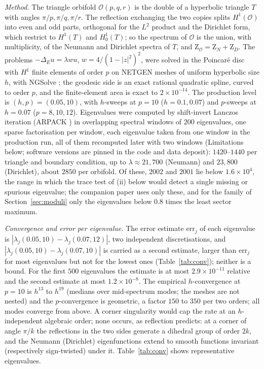 \documentclass[pdflatex,sn-mathphys-num]{sn-jnl}
\newcommand{\Orb}{\mathcal{O}}
\newcommand{\cZ}{\mathrm{Z}}
\theoremstyle{thmstyleone}%
\theoremstyle{thmstylethree}%
\providecommand{\Orb}{\mathcal{O}}
\providecommand{\cZ}{\mathrm{Z}}
\begin{document}
\emph{Method.} The triangle orbifold $\Orb(p,q,r)$ is the double of a hyperbolic triangle $T$ with angles $\pi/p,\pi/q,\pi/r$. The reflection exchanging the two copies splits $H^1(\Orb)$ into even and odd parts, orthogonal for the $L^2$ product and the Dirichlet form, which restrict to $H^1(T)$ and $H^1_0(T)$; so the spectrum of $\Orb$ is the union, with multiplicity, of the Neumann and Dirichlet spectra of $T$, and $\cZ_\Orb=\cZ_N+\cZ_D$. The problems $-\Delta_Eu=\lambda wu$, $w=4/(1-|z|^2)^2$, were solved in the Poincar\'e disc with $H^1$ finite elements of order $p$ on NETGEN meshes \cite{schoberl1997} of uniform hyperbolic size $h$, with NGSolve \cite{ngsolve}; the geodesic side is an exact rational quadratic spline, curved to order $p$, and the finite-element area is exact to $2\times10^{-14}$. The production level is $(h,p)=(0.05,10)$, with $h$-sweeps at $p=10$ ($h=0.1,0.07$) and $p$-sweeps at $h=0.07$ ($p=8,10,12$). Eigenvalues were computed by shift-invert Lanczos iteration (ARPACK \cite{arpack1998}) in overlapping spectral windows of $200$ eigenvalues, one sparse factorisation per window, each eigenvalue taken from one window in the production run, all of them recomputed later with two windows (Limitations below; software versions are pinned in the code and data deposit): $1420$--$1440$ per triangle and boundary condition, up to $\lambda\approx21{,}700$ (Neumann) and $23{,}800$ (Dirichlet), about $2850$ per orbifold. Of these, $2002$ and $2001$ lie below $1.6\times10^4$, the range in which the trace test of (ii) below would detect a single missing or spurious eigenvalue; the companion paper \cite{companionB} uses only these, and for the family of Section~\ref{sec:moduli} only the eigenvalues below $0.8$ times the least sector maximum.

\emph{Convergence and error per eigenvalue.} The error estimate $\mathrm{err}_j$ of each eigenvalue is $|\lambda_j(0.05,10)-\lambda_j(0.07,12)|$, two independent discretisations, and $|\lambda_j(0.05,10)-\lambda_j(0.07,10)|$ is carried as a second estimate, larger than $\mathrm{err}_j$ for most eigenvalues but not for the lowest ones (Table~\ref{tab:conv}); neither is a bound. For the first $500$ eigenvalues the estimate is at most $2.9\times10^{-11}$ relative and the second estimate at most $1.2\times10^{-8}$. The empirical $h$-convergence at $p=10$ is $h^{13}$ to $h^{19}$ (medians over mid-spectrum modes; the meshes are not nested) and the $p$-convergence is geometric, a factor $150$ to $350$ per two orders; all modes converge from above. A corner singularity would cap the rate at an $h$-independent algebraic order; none occurs, as reflection predicts: at a corner of angle $\pi/k$ the reflections in the two sides generate a dihedral group of order $2k$, and the Neumann (Dirichlet) eigenfunctions extend to smooth functions invariant (respectively sign-twisted) under it. Table~\ref{tab:conv} shows representative eigenvalues.
\end{document}
